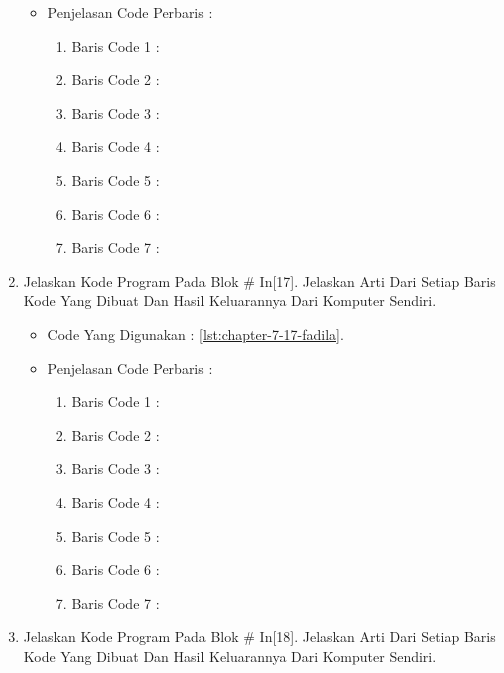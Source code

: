 \begin{enumerate}
\begin{itemize}
\par
\par
\item Penjelasan Code Perbaris	: 
\begin{enumerate}
\item Baris Code 1	:
\item Baris Code 2	:
\item Baris Code 3	:
\item Baris Code 4	:
\item Baris Code 5	:
\item Baris Code 6	:
\item Baris Code 7	:
\end{enumerate}
\par
\end{itemize}
\par
\par
\par
\item Jelaskan Kode Program Pada Blok \# In[17]. Jelaskan Arti Dari Setiap Baris Kode Yang Dibuat Dan Hasil Keluarannya Dari Komputer Sendiri.
\begin{itemize}
\item Code Yang Digunakan : \ref{lst:chapter-7-17-fadila}.

\par
\par
\item Penjelasan Code Perbaris	: 
\begin{enumerate}
\item Baris Code 1	:
\item Baris Code 2	:
\item Baris Code 3	:
\item Baris Code 4	:
\item Baris Code 5	:
\item Baris Code 6	:
\item Baris Code 7	:
\end{enumerate}
\par
\par
\end{itemize}
\par
\par
\par
\item Jelaskan Kode Program Pada Blok \# In[18]. Jelaskan Arti Dari Setiap Baris Kode Yang Dibuat Dan Hasil Keluarannya Dari Komputer Sendiri.

\end{enumerate}
